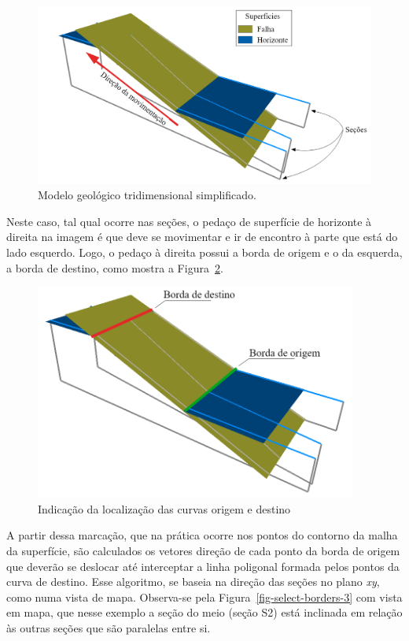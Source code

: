 \begin{figure} [H]
  \begin{center}
    \includegraphics[width=350pt]{images/fig-select-borders-1}
    \caption{Modelo geológico tridimensional simplificado.}\label{fig-select-borders-1}
  \end{center}
\end{figure}

Neste caso, tal qual ocorre nas seções, o pedaço de superfície de horizonte à direita na imagem é que deve se movimentar e ir de encontro à parte que está do lado esquerdo. Logo, o pedaço à direita possui a borda de origem e o da esquerda, a borda de destino, como mostra a Figura~\ref{fig-select-borders-2}.

\begin{figure} [H]
  \begin{center}
    \includegraphics[width=300pt]{images/fig-select-borders-2}
    \caption{Indicação da localização das curvas origem e destino}\label{fig-select-borders-2}
  \end{center}
\end{figure}

A partir dessa marcação, que na prática ocorre nos pontos do contorno da malha da superfície, são calculados os vetores direção de cada ponto da borda de origem que deverão se deslocar até interceptar a linha poligonal formada pelos pontos da curva de destino. Esse algoritmo, se baseia na direção das seções no plano \textit{xy}, como numa vista de mapa. Observa-se pela Figura~\ref{fig-select-borders-3} com vista em mapa, que nesse exemplo a seção do meio (seção S2) está inclinada em relação às outras seções que são paralelas entre si.

